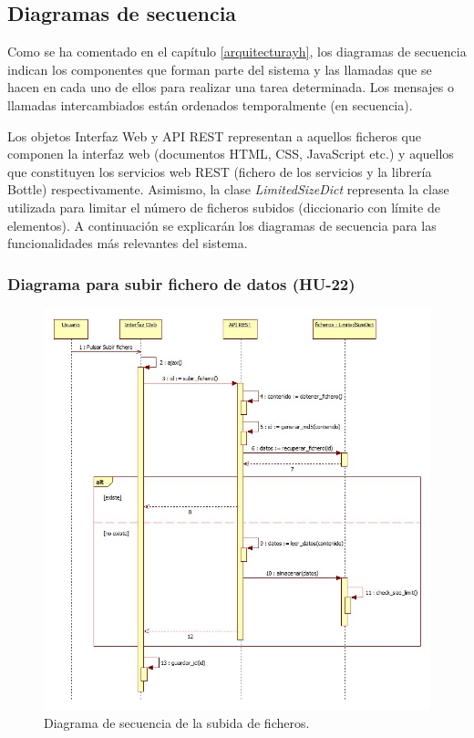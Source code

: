 \subsection{Diagramas de secuencia}
Como se ha comentado en el capítulo \ref{arquitecturayh}, los diagramas de secuencia indican los componentes que forman parte del sistema y las llamadas que se hacen en cada uno de ellos para realizar una tarea determinada. Los mensajes o llamadas intercambiados están ordenados temporalmente (en secuencia).

Los objetos Interfaz Web y API REST representan a aquellos ficheros que componen la interfaz web (documentos HTML, CSS, JavaScript etc.) y aquellos que constituyen los servicios web REST (fichero de los servicios y la librería Bottle) respectivamente. Asimismo, la clase \textit{LimitedSizeDict} representa la clase utilizada para limitar el número de ficheros subidos (diccionario con límite de elementos). A continuación se explicarán los diagramas de secuencia para las funcionalidades más relevantes del sistema.

\subsubsection{Diagrama para subir fichero de datos (HU-22)}

\begin{figure}[H]
\centering
\includegraphics[scale=0.5]{figuras/sec_subir_fichero.jpg}
\caption{Diagrama de secuencia de la subida de ficheros.}
\label{fig:sec_subir_fichero}
\end{figure}

